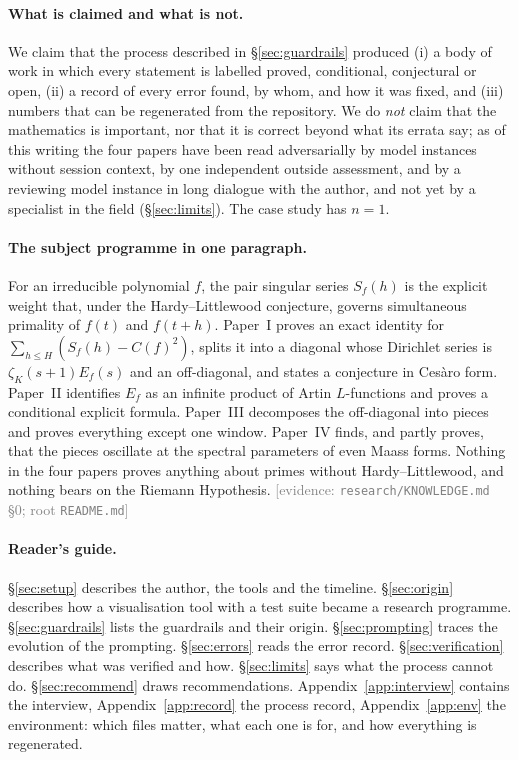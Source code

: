 \documentclass[11pt,a4paper]{article}
\newcommand{\evidence}[1]{{\footnotesize\textcolor{Gray}{[evidence: #1]}}}
\newcommand{\file}[1]{\texttt{#1}}
\begin{document}
\paragraph{What is claimed and what is not.} We claim that the process described in \S\ref{sec:guardrails} produced
(i) a body of work in which every statement is labelled proved, conditional, conjectural or open, (ii) a record of
every error found, by whom, and how it was fixed, and (iii) numbers that can be regenerated from the repository. We
do \emph{not} claim that the mathematics is important, nor that it is correct beyond what its errata say; as of
this writing the four papers have been read adversarially by model instances without session context, by one
independent outside assessment, and by a reviewing model instance in long dialogue with the author, and not yet by a
specialist in the field (\S\ref{sec:limits}). The case study has $n=1$.

\paragraph{The subject programme in one paragraph.} For an irreducible polynomial $f$, the pair singular series
$S_f(h)$ is the explicit weight that, under the Hardy--Littlewood conjecture, governs simultaneous primality of
$f(t)$ and $f(t+h)$. Paper~I proves an exact identity for $\sum_{h\le H}(S_f(h)-C(f)^2)$, splits it into a diagonal
whose Dirichlet series is $\zeta_K(s+1)E_f(s)$ and an off-diagonal, and states a conjecture in Ces\`aro form.
Paper~II identifies $E_f$ as an infinite product of Artin $L$-functions and proves a conditional explicit formula.
Paper~III decomposes the off-diagonal into pieces and proves everything except one window. Paper~IV finds, and
partly proves, that the pieces oscillate at the spectral parameters of even Maass forms. Nothing in the four papers
proves anything about primes without Hardy--Littlewood, and nothing bears on the Riemann Hypothesis.
\evidence{\file{research/KNOWLEDGE.md} \S0; root \file{README.md}}

\paragraph{Reader's guide.} \S\ref{sec:setup} describes the author, the tools and the timeline. \S\ref{sec:origin}
describes how a visualisation tool with a test suite became a research programme. \S\ref{sec:guardrails} lists the
guardrails and their origin. \S\ref{sec:prompting} traces the evolution of the prompting. \S\ref{sec:errors} reads
the error record. \S\ref{sec:verification} describes what was verified and how. \S\ref{sec:limits} says what the
process cannot do. \S\ref{sec:recommend} draws recommendations. Appendix~\ref{app:interview} contains the interview,
Appendix~\ref{app:record} the process record, Appendix~\ref{app:env} the
environment: which files matter, what each one is for, and how everything is regenerated.
\end{document}
